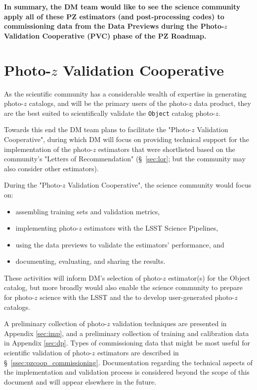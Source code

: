 \documentclass[DM,authoryear,toc]{lsstdoc}
\begin{document}
\textbf{In summary, the DM team would like to see the science community apply all of these PZ estimators (and post-processing codes) to commissioning data from the Data Previews during the Photo-$z$ Validation Cooperative (PVC) phase of the PZ Roadmap.}




\section{Photo-$z$ Validation Cooperative}\label{sec:pzcoop}

As the scientific community has a considerable wealth of expertise in generating photo-$z$ catalogs, and will be the primary users of the photo-$z$ data product, they are the best suited to scientifically validate the {\tt Object} catalog photo-$z$.

Towards this end the DM team plans to facilitate the "Photo-$z$ Validation Cooperative", during which DM will focus on providing technical support for the implementation of the photo-$z$ estimators that were shortlisted based on the community's "Letters of Recommendation" (\S~\ref{sec:lor}; but the community may also consider other estimators).

During the "Photo-$z$ Validation Cooperative", the science community would focus on:
\begin{itemize}
\item assembling training sets and validation metrics,
\item implementing photo-$z$ estimators with the LSST Science Pipelines,
\item using the data previews to validate the estimators' performance, and
\item documenting, evaluating, and sharing the results.
\end{itemize}

These activities will inform DM's selection of photo-$z$ estimator(s) for the Object catalog, but more broadly would also enable the science community to prepare for photo-$z$ science with the LSST and the to develop user-generated photo-$z$ catalogs.

A preliminary collection of photo-$z$ validation techniques are presented in Appendix \ref{sec:imp}, and a preliminary collection of training and calibration data in Appendix \ref{sec:dp}.
Types of commissioning data that might be most useful for scientific validation of photo-$z$ estimators are described in \S~\ref{ssec:pzcoop_commissioning}.
Documentation regarding the technical aspects of the implementation and validation process is considered beyond the scope of this document and will appear elsewhere in the future.
\end{document}
